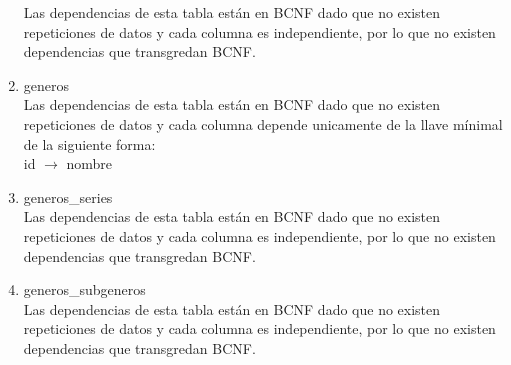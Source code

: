 \documentclass{article}
\begin{document}
\begin{enumerate}
    Las dependencias de esta tabla están en BCNF dado que no existen repeticiones de datos y cada columna es independiente, por lo que no existen dependencias que transgredan BCNF. \\
     \item generos \\
    Las dependencias de esta tabla están en BCNF dado que no existen repeticiones de datos y cada columna depende unicamente de la llave mínimal de la siguiente forma: \\
    id $\rightarrow$ nombre \\
    \item generos\_series \\
    Las dependencias de esta tabla están en BCNF dado que no existen repeticiones de datos y cada columna es independiente, por lo que no existen dependencias que transgredan BCNF. \\
    \item generos\_subgeneros\\
    Las dependencias de esta tabla están en BCNF dado que no existen repeticiones de datos y cada columna es independiente, por lo que no existen dependencias que transgredan BCNF. \\
\end{enumerate}
\end{document}
